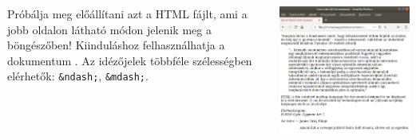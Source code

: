 \documentclass[usenames,dvipsnames,aspectratio=169]{beamer}
\begin{document}
\begin{frame}
  \begin{columns}[c]
      Próbálja meg előállítani azt a HTML fájlt, ami a jobb oldalon látható módon jelenik meg a böngészőben!
      Kiinduláshoz felhasználhatja a dokumentum .
      Az idézőjelek többféle szélességben elérhetők: \texttt{\&ndash;}, \texttt{\&mdash;}.
      \begin{center}
        \begin{exampleblock}{}
          \centering \includegraphics[scale=.23]{idezes.png}
        \end{exampleblock}
      \end{center}
  \end{columns}
\end{frame}
\end{document}
